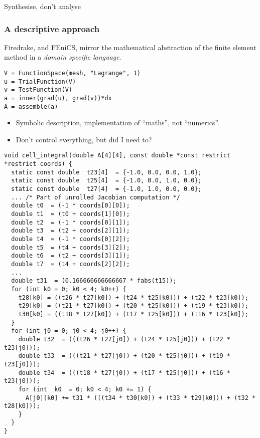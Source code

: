 \documentclass[presentation]{beamer}
\begin{document}
\begin{frame}[standout]
  Synthesise, don't analyse
\end{frame}

\bgroup
{}
\begin{frame}[plain]
\end{frame}
\begin{frame}[plain]
\end{frame}
\egroup

\begin{frame}[fragile]
  \frametitle{A descriptive approach}
  Firedrake, and FEniCS, mirror the mathematical abstraction of the
  finite element method in a \emph{domain specific language}.

  \begin{center}
\begin{verbatim}
V = FunctionSpace(mesh, "Lagrange", 1)
u = TrialFunction(V)
v = TestFunction(V)
a = inner(grad(u), grad(v))*dx
A = assemble(a)
\end{verbatim}
  \end{center}
  \begin{itemize}
  \item Symbolic description, implementation of ``maths'', not
    ``numerics''.
  \item Don't control everything, but did I need to?
  \end{itemize}
\end{frame}

\begin{frame}[fragile]
\begin{verbatim}
void cell_integral(double A[4][4], const double *const restrict *restrict coords) {
  static const double  t23[4]  = {-1.0, 0.0, 0.0, 1.0};
  static const double  t25[4]  = {-1.0, 0.0, 1.0, 0.0};
  static const double  t27[4]  = {-1.0, 1.0, 0.0, 0.0};
  ... /* Part of unrolled Jacobian computation */
  double t0  = (-1 * coords[0][0]);
  double t1  = (t0 + coords[1][0]);
  double t2  = (-1 * coords[0][1]);
  double t3  = (t2 + coords[2][1]);
  double t4  = (-1 * coords[0][2]);
  double t5  = (t4 + coords[3][2]);
  double t6  = (t2 + coords[3][1]);
  double t7  = (t4 + coords[2][2]);
  ...
  double t31  = (0.166666666666667 * fabs(t15));
  for (int k0 = 0; k0 < 4; k0++) {
    t28[k0] = ((t26 * t27[k0]) + (t24 * t25[k0])) + (t22 * t23[k0]);
    t29[k0] = ((t21 * t27[k0]) + (t20 * t25[k0])) + (t19 * t23[k0]);
    t30[k0] = ((t18 * t27[k0]) + (t17 * t25[k0])) + (t16 * t23[k0]);
  }
  for (int j0 = 0; j0 < 4; j0++) {
    double t32  = (((t26 * t27[j0]) + (t24 * t25[j0])) + (t22 * t23[j0]));
    double t33  = (((t21 * t27[j0]) + (t20 * t25[j0])) + (t19 * t23[j0]));
    double t34  = (((t18 * t27[j0]) + (t17 * t25[j0])) + (t16 * t23[j0]));
    for (int  k0  = 0; k0 < 4; k0 += 1) {
      A[j0][k0] += t31 * (((t34 * t30[k0]) + (t33 * t29[k0])) + (t32 * t28[k0]));
    }
  }
}
\end{verbatim}
\end{frame}
\end{document}
